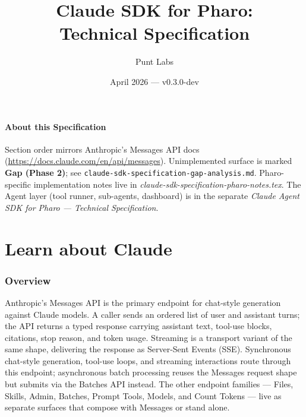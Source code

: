 \documentclass[a4paper,10pt,fleqn]{article}
\begin{document}
\title{Claude SDK for Pharo:\\Technical Specification}
\author{Punt Labs}
\date{April 2026 --- v0.3.0-dev}
\maketitle

\tableofcontents
\newpage

\subsection*{About this Specification}

Section order mirrors Anthropic's Messages API docs
(\url{https://docs.claude.com/en/api/messages}).  Unimplemented
surface is marked \textbf{Gap (Phase 2)}; see
\texttt{claude-sdk-specification-gap-analysis.md}.  Pharo-specific
implementation notes live in
\emph{claude-sdk-specification-pharo-notes.tex}.  The Agent layer
(tool runner, sub-agents, dashboard) is in the separate
\emph{Claude Agent SDK for Pharo --- Technical Specification}.


\part{Learn about Claude}

\section{Overview}
\label{sec:overview}

Anthropic's Messages API is the primary endpoint for chat-style
generation against Claude models.  A caller sends an ordered list
of user and assistant turns; the API returns a typed response
carrying assistant text, tool-use blocks, citations, stop reason,
and token usage.  Streaming is a transport variant of the same
shape, delivering the response as Server-Sent Events (SSE).
Synchronous chat-style generation, tool-use loops, and streaming
interactions route through this endpoint; asynchronous batch
processing reuses the Messages request shape but submits via the
Batches API instead.  The other endpoint families --- Files,
Skills, Admin, Batches, Prompt Tools, Models, and Count Tokens
--- live as separate surfaces that compose with Messages or
stand alone.
\end{document}
